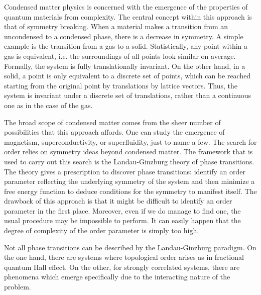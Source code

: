 \label{cap:int}

Condensed matter physics is concerned with the emergence of the properties of quantum materials from complexity. The central concept within this approach is that of symmetry breaking. When a material makes a transition from an uncondensed to a condensed phase, there is a decrease in symmetry. A simple example is the transition from a gas to a solid. Statistically, any point within a gas is equivalent, i.e. the surroundings of all points look similar on average. Formally, the system is fully  translationally invariant. On the other hand, in a solid, a point is only equivalent to a discrete set of points, which can be reached starting from the original point by translations by lattice vectors. Thus, the system is invariant under a discrete set of translations, rather than a continuous one as in the case of the gas.

The broad scope of condensed matter comes from the sheer number of possibilities that this approach affords. One can study the emergence of magnetism, superconductivity, or superfluidity, just to name a few. The search for order relies on symmetry ideas beyond condensed matter. The framework that is used to carry out this search is the Landau-Ginzburg theory of phase transitions. The theory gives a prescription to discover phase transitions: identify an order parameter reflecting the underlying symmetry of the system and then minimize a free energy function to deduce conditions for the symmetry to manifest itself. The drawback of this approach is that it might be difficult to identify an order parameter in the first place. Moreover, even if we do manage to find one, the usual procedure may be impossible to perform. It can easily happen that the degree of complexity of the order parameter is simply too high.

Not all phase transitions can be described by the Landau-Ginzburg paradigm. On the one hand, there are systems where topological order arises as in fractional quantum Hall effect. On the other, for strongly correlated systems, there are phenomena which emerge specifically due to the interacting nature of the problem.






\cleardoublepage